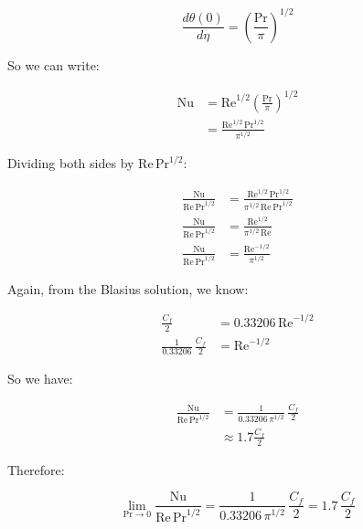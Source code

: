 \documentclass[letterpaper,12pt]{article}
\begin{document}
\begin{equation}
    \frac{d\theta(0)}{d\eta}=\left(\frac{\text{Pr}}{\pi}\right)^{1/2}
\end{equation}

So we can write:

\begin{equation}
\begin{aligned}
    \text{Nu} &= \text{Re}^{1/2}\left(\frac{\text{Pr}}{\pi}\right)^{1/2}\\
              &= \frac{\text{Re}^{1/2}\,\text{Pr}^{1/2}}{\pi^{1/2}}
\end{aligned}
\end{equation}

Dividing both sides by $\text{Re}\,\text{Pr}^{1/2}$:

\begin{equation}
\begin{aligned}
    \frac{\text{Nu}}{\text{Re}\,\text{Pr}^{1/2}} &= \frac{\text{Re}^{1/2}\,\text{Pr}^{1/2}}{\pi^{1/2}\,\text{Re}\,\text{Pr}^{1/2}} \\
    \frac{\text{Nu}}{\text{Re}\,\text{Pr}^{1/2}} &= \frac{\text{Re}^{1/2}}{\pi^{1/2}\,\text{Re}} \\
    \frac{\text{Nu}}{\text{Re}\,\text{Pr}^{1/2}} &= \frac{\text{Re}^{-1/2}}{\pi^{1/2}}
\end{aligned}
\end{equation}

Again, from the Blasius solution, we know:

\begin{equation}
\begin{aligned}
    \frac{C_f}{2}                    &= 0.33206\,\text{Re}^{-1/2} \\ 
    \frac{1}{0.33206}\,\frac{C_f}{2} &= \text{Re}^{-1/2}
\end{aligned}
\end{equation}

So we have:

\begin{equation}
\begin{aligned}
    \frac{\text{Nu}}{\text{Re}\,\text{Pr}^{1/2}} &= \frac{1}{0.33206\,\pi^{1/2}}\,\frac{C_f}{2} \\
                                                 &\approx 1.7 \frac{C_f}{2}
\end{aligned}
\end{equation}

Therefore:

\begin{equation}
\boxed{
    \lim_{\text{Pr}\to0}\frac{\text{Nu}}{\text{Re}\,\text{Pr}^{1/2}}=\frac{1}{0.33206\,\pi^{1/2}}\,\frac{C_f}{2}=1.7\,\frac{C_f}{2}
}
\end{equation}

\vspace{6pt}

\end{document}
